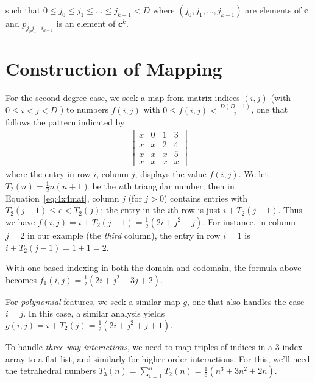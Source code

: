 \documentclass{article} %
\begin{document}
such that $ 0 \le j_0 \le j_1 \le \dots \le j_{k-1} < D$
where $(j_0, j_1, \dots, j_{k-1})$ are elements of $\bm{c}$ and $p_{j_0j_1 \dots i_{k-1}}$ is an element of $\bm{c}^k$. %

\section{Construction of Mapping}
For the second degree case, we seek a map from matrix indices $(i, j)$ (with $0 \le i < j < D$ ) to numbers $f(i, j)$ with $0 \le f(i, j) < \frac{D(D-1)}{2}$, one that follows the pattern indicated by 
\begin{align}
\begin{bmatrix}
x & 0 & 1 & 3 \\
x & x & 2 & 4 \\
x & x & x & 5 \\
x & x & x & x
\end{bmatrix}
\label{eq:4x4mat}
\end{align}
where the entry in row $i$, column $j$, displays the value $f(i, j)$. We let $T_2(n) = \frac{1}{2} n(n+1)$ 
be the $n$th triangular number; then in Equation~\ref{eq:4x4mat}, column $j$ (for $j > 0$) contains entries with  
$T_2(j-1) \le e < T_2(j)$; the entry in the $i$th row is just $i + T_2(j-1)$. Thus we have
$
f(i, j) 
= i + T_2(j-1) =  \frac{1}{2}(2i + j^2-j).$
For instance, in column $j = 2$ in our example (the \emph{third} column), the entry in row $i = 1$ is 
$i + T_2(j-1) = 1 + 1 = 2$. 

With one-based indexing in both the domain and codomain, the formula above becomes
$f_1(i, j)  = \frac{1}{2}(2i + j^2 - 3j + 2).$

For \emph{polynomial} features, we seek a similar map $g$, one that also handles the case $i = j$. In this case, a similar analysis yields
$ g(i, j) = i + T_2(j) = \frac{1}{2} (2i + j^2 + j + 1).$


To handle \emph{three-way interactions}, we need to map triples of indices in a 3-index array to a flat list, and similarly for higher-order interactions. For this, we'll need the tetrahedral numbers $T_3(n) = \sum_{i=1}^n T_{2}(n) = 
\frac{1}{6}(n^3 + 3n^2 + 2n)$.
\end{document}
